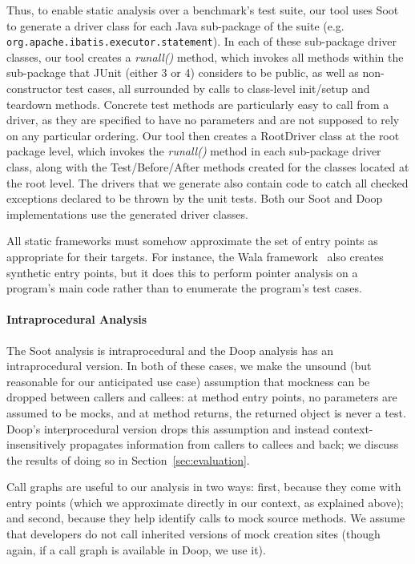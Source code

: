 
Thus, to enable static analysis over a benchmark's test suite, our tool uses Soot to generate a driver class for each Java sub-package of the suite (e.g. \texttt{org.apache.ibatis.executor.statement}). In each of these sub-package driver classes, our tool creates a \textit{runall()} method, which invokes all methods within the sub-package that JUnit (either 3 or 4) considers to be public, as well as non-constructor test cases, all surrounded by calls to class-level init/setup and teardown methods. Concrete test methods are particularly easy to call from a driver, as they are specified to have no parameters and are not supposed to rely on any particular ordering. 
Our tool then creates a RootDriver class at the root package level, which invokes the \textit{runall()} method in each sub-package driver class, along with the Test/Before/After methods created for the classes located at the root level. The drivers that we generate also contain code to catch all checked exceptions declared to be thrown by the unit tests. Both our Soot and Doop implementations use the generated driver classes.

All static frameworks must somehow approximate the set of entry points as appropriate for their targets. For instance, the Wala framework~\cite{wala19:_t} also creates synthetic entry points, but it does this to perform pointer analysis on a program's main code rather than to enumerate the program's test cases.

\paragraph{Intraprocedural Analysis} The Soot analysis is intraprocedural and the Doop analysis has an intraprocedural version. In both of these cases, we make the unsound (but reasonable for our anticipated use case) assumption that mockness can be dropped between callers and callees: at method entry points, no parameters are assumed to be mocks, and at method returns, the returned object is never a test. Doop's interprocedural version drops this assumption and instead context-insensitively propagates information from callers to callees and back; we discuss the results of doing so in Section~\ref{sec:evaluation}.

Call graphs are useful to our analysis in two ways: first, because they come with entry points (which we approximate directly in our context, as explained above); and second, because they help identify calls to mock source methods. We assume that developers do not call inherited versions of mock creation sites (though again, if a call graph is available in Doop, we use it).

